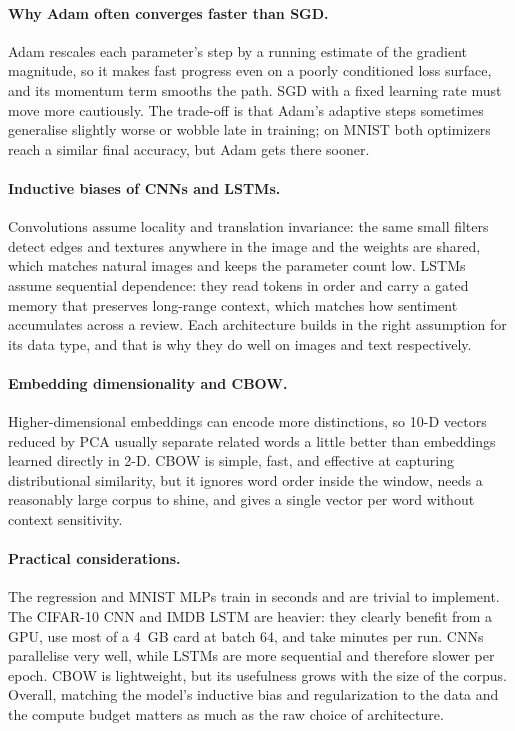 \documentclass[11pt,a4paper]{article}
\begin{document}
\paragraph{Why Adam often converges faster than SGD.} Adam rescales each parameter's step by
a running estimate of the gradient magnitude, so it makes fast progress even on a poorly
conditioned loss surface, and its momentum term smooths the path. SGD with a fixed learning
rate must move more cautiously. The trade-off is that Adam's adaptive steps sometimes
generalise slightly worse or wobble late in training; on MNIST both optimizers reach a
similar final accuracy, but Adam gets there sooner.

\paragraph{Inductive biases of CNNs and LSTMs.} Convolutions assume locality and translation
invariance: the same small filters detect edges and textures anywhere in the image and the
weights are shared, which matches natural images and keeps the parameter count low. LSTMs
assume sequential dependence: they read tokens in order and carry a gated memory that
preserves long-range context, which matches how sentiment accumulates across a review. Each
architecture builds in the right assumption for its data type, and that is why they do well
on images and text respectively.

\paragraph{Embedding dimensionality and CBOW.} Higher-dimensional embeddings can encode more
distinctions, so 10-D vectors reduced by PCA usually separate related words a little better
than embeddings learned directly in 2-D. CBOW is simple, fast, and effective at capturing
distributional similarity, but it ignores word order inside the window, needs a reasonably
large corpus to shine, and gives a single vector per word without context sensitivity.

\paragraph{Practical considerations.} The regression and MNIST MLPs train in seconds and are
trivial to implement. The CIFAR-10 CNN and IMDB LSTM are heavier: they clearly benefit from
a GPU, use most of a 4~GB card at batch 64, and take minutes per run. CNNs parallelise very
well, while LSTMs are more sequential and therefore slower per epoch. CBOW is lightweight,
but its usefulness grows with the size of the corpus. Overall, matching the model's
inductive bias and regularization to the data and the compute budget matters as much as the
raw choice of architecture.
\end{document}
